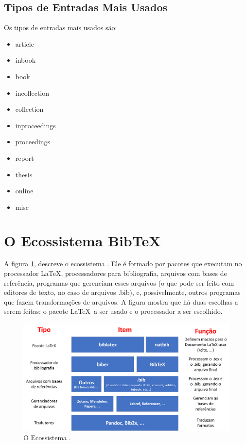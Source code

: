 
\subsection{Tipos de Entradas Mais Usados}

Os tipos de entradas mais usados são:
\begin{itemize}
    \item article
    \item inbook
    \item book
    \item incollection
    \item collection
    \item inproceedings
    \item proceedings
    \item report
    \item thesis
    \item online
    \item misc
\end{itemize}


\section{O Ecossistema BibTeX}


A figura \ref{fig:mundolatexport}\autocite{bibera2012}, descreve o ecossistema . Ele é formado por pacotes que executam no processador \LaTeX , processadores para bibliografia, arquivos com bases de referência, programas que gerenciam esses arquivos (o que pode ser feito com editores de texto, no caso de arquivos .bib), e, possivelmente, outros programas que fazem transformações de arquivos. A figura mostra que há duas escolhas a serem feitas: o pacote \LaTeX\  a ser usado e o processador
a ser escolhido. 

\begin{figure}[hbt]
    \centering
    \includegraphics[width=0.9\linewidth]{Images/mundolatexport}
    \caption{O Ecossistema \parencite{bibera2012}.}
    \label{fig:mundolatexport}
\end{figure}



